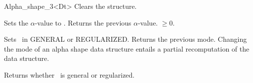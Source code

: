 \begin{ccRefClass} {Alpha_shape_3<Dt>}
{Clears the structure.}

{Sets the $\alpha$-value to .
 Returns the previous $\alpha$-value.
\ccPrecond {} $\geq 0$.}

{Sets \ccVar\ in GENERAL  or REGULARIZED. 
Returns the previous mode. 
Changing the mode of an alpha shape data structure
entails a partial recomputation of the data structure.}

% 
% 
% 






{Returns whether \ccVar\ is general or regularized.}


\end{ccRefClass}
